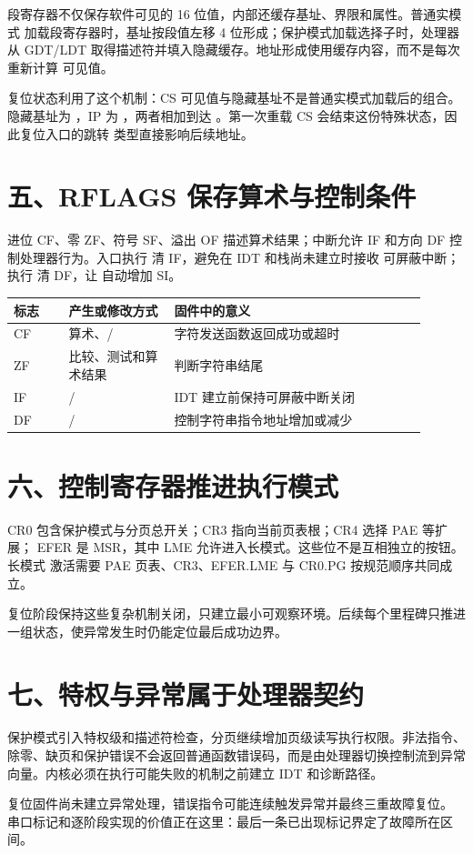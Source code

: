 段寄存器不仅保存软件可见的 16 位值，内部还缓存基址、界限和属性。普通实模式
加载段寄存器时，基址按段值左移 4 位形成；保护模式加载选择子时，处理器从
GDT/LDT 取得描述符并填入隐藏缓存。地址形成使用缓存内容，而不是每次重新计算
可见值。

复位状态利用了这个机制：CS 可见值与隐藏基址不是普通实模式加载后的组合。
隐藏基址为 ，IP 为 ，两者相加到达
。第一次重载 CS 会结束这份特殊状态，因此复位入口的跳转
类型直接影响后续地址。

\section{五、RFLAGS 保存算术与控制条件}

进位 CF、零 ZF、符号 SF、溢出 OF 描述算术结果；中断允许 IF 和方向 DF
控制处理器行为。入口执行  清 IF，避免在 IDT 和栈尚未建立时接收
可屏蔽中断；执行  清 DF，让  自动增加 SI。

\begin{longtable}{L{0.12\linewidth}L{0.23\linewidth}L{0.55\linewidth}}
\toprule
标志 & 产生或修改方式 & 固件中的意义 \\
\midrule
CF & 算术、/ & 字符发送函数返回成功或超时 \\
ZF & 比较、测试和算术结果 &  判断字符串结尾 \\
IF & / & IDT 建立前保持可屏蔽中断关闭 \\
DF & / & 控制字符串指令地址增加或减少 \\
\bottomrule
\end{longtable}

\section{六、控制寄存器推进执行模式}

CR0 包含保护模式与分页总开关；CR3 指向当前页表根；CR4 选择 PAE 等扩展；
EFER 是 MSR，其中 LME 允许进入长模式。这些位不是互相独立的按钮。长模式
激活需要 PAE 页表、CR3、EFER.LME 与 CR0.PG 按规范顺序共同成立。

复位阶段保持这些复杂机制关闭，只建立最小可观察环境。后续每个里程碑只推进
一组状态，使异常发生时仍能定位最后成功边界。

\section{七、特权与异常属于处理器契约}

保护模式引入特权级和描述符检查，分页继续增加页级读写执行权限。非法指令、
除零、缺页和保护错误不会返回普通函数错误码，而是由处理器切换控制流到异常
向量。内核必须在执行可能失败的机制之前建立 IDT 和诊断路径。

复位固件尚未建立异常处理，错误指令可能连续触发异常并最终三重故障复位。
串口标记和逐阶段实现的价值正在这里：最后一条已出现标记界定了故障所在区间。
